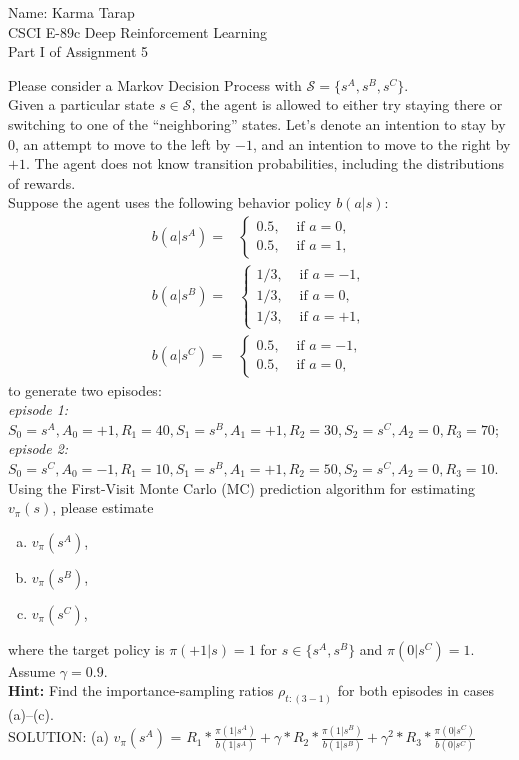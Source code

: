 \documentclass[12pt]{letter}
\begin{document}
\begin{flushleft}
{\sc Name: Karma Tarap}\\
CSCI E-89c Deep Reinforcement Learning\\
Part I of Assignment 5\\
\end{flushleft}

Please consider a Markov Decision Process with  $\mathcal{S}=\{s^{A},s^{B},s^{C}\}$.\medskip\\
Given a particular state $s\in \mathcal{S}$, the agent is allowed to either try staying there or switching to one of the ``neighboring'' states. Let's denote an intention to stay by $0$, an attempt to move to the left by $-1$, and an intention to move to the right by $+1$. The agent does not know transition probabilities, including the distributions of rewards.\medskip\\
Suppose the agent uses the following behavior policy $b(a|s)$:
\small{\begin{equation*}
\begin{aligned}
b(a|s^A)=&\begin{cases}
0.5,& \text{ if } a=0,\\
0.5,& \text{ if } a=1,
\end{cases}\\
b(a|s^B)=&\begin{cases}
1/3,& \text{ if } a=-1,\\
1/3,& \text{ if } a=0,\\
1/3,& \text{ if } a=+1,
\end{cases}\\
b(a|s^C)=&\begin{cases}
0.5,& \text{ if } a=-1,\\
0.5,& \text{ if } a=0,
\end{cases}
\end{aligned}
\end{equation*}}to generate two episodes:\medskip\\
{\small
{\it episode 1:}\\
$S_0=s^A,A_0=+1,R_1=40, S_1=s^B,A_1=+1,R_2=30, S_2=s^C,A_2=0,R_3=70$;\medskip\\
{\it episode 2:}\\
$S_0=s^C,A_0=-1,R_1=10, S_1=s^B,A_1=+1,R_2=50, S_2=s^C,A_2=0,R_3=10$.\medskip\\}
Using the First-Visit Monte Carlo (MC) prediction algorithm for estimating $v_\pi(s)$, please estimate 
\begin{enumerate}[(a)]
\item $v_\pi(s^A)$,
\item $v_\pi(s^B)$,
\item $v_\pi(s^C)$,
\end{enumerate}
where the target policy is $\pi(+1|s)=1$ for $s\in\{s^A,s^B\}$ and $\pi(0|s^C)=1$. Assume $\gamma=0.9$.\medskip\\
{\bf Hint:} Find the importance-sampling ratios $\rho_{t:(3-1)}$ for both episodes in cases (a)--(c).\medskip\\
SOLUTION:
(a)
$v_\pi(s^A)$ = $R_1 * \frac{\pi(1|s^A)}{b(1|s^A)} + \gamma * R_2 * \frac{\pi(1|s^B)}{b(1|s^B)} + \gamma^2 * R_3 * \frac{\pi(0|s^C)}{b(0|s^C)}$
\end{document}
